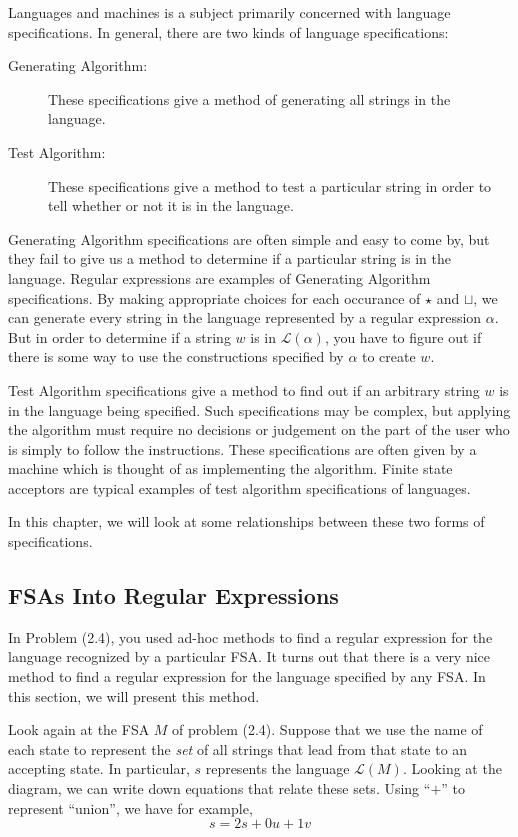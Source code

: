 \documentclass{article}
\newcommand{\El}{\mathcal L}
\begin{document}
Languages and machines is a subject primarily concerned with language specifications. In general, there are two kinds of language specifications:
\begin{description}
  \item[Generating Algorithm:] These specifications give a method of generating all strings in the language.
  \item[Test Algorithm:] These specifications give a method to test a particular string in order to tell whether or not it is in the language.
\end{description}

Generating Algorithm specifications are often simple and easy to come by, but they fail to give us a method to determine if a particular string is in the language. Regular expressions are examples of Generating Algorithm specifications. By making appropriate choices for each occurance of $\star$ and $\sqcup$, we can generate every string in the language represented by a regular expression $\alpha$. But in order to determine if a string $w$ is in $\El(\alpha)$, you have to figure out if there is some way to use the constructions specified by $\alpha$ to create $w$.

Test Algorithm specifications give a method to find out if an arbitrary string $w$ is in the language being specified. Such specifications may be complex, but applying the algorithm must require no decisions or judgement on the part of the user who is simply to follow the instructions. These specifications are often given by a machine which is thought of as implementing the algorithm. Finite state acceptors are typical examples of test algorithm specifications of languages.

In this chapter, we will look at some relationships between these two forms of specifications. 


\subsection{FSAs Into Regular Expressions} %


In Problem (2.4), you used ad-hoc methods to find a regular expression for the language recognized by a particular FSA. It turns out that there is a very nice method to find a regular expression for the language specified by any FSA. In this section, we will present this method.

Look again at the FSA $M$ of problem (2.4). Suppose that we use the name of each state to represent the \emph{set} of all strings that lead from that state to an accepting state. In particular, $s$ represents the language $\El(M)$. Looking at the diagram, we can write down equations that relate these sets. Using ``$+$'' to represent ``union'', we have for example,
\begin{equation*}
s = 2s + 0u + 1v
\end{equation*}
\end{document}
